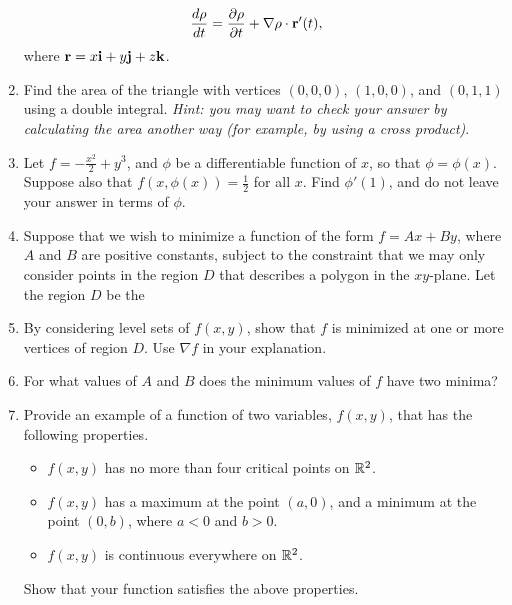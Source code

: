 \documentclass{article}
\begin{document}
\begin{enumerate}
\begin{align*}
  \frac{d\rho}{dt} &= \frac{\partial \rho}{\partial t} + \nabla \rho \cdot \mathbf{r}'(t),
\end{align*}
where $\mathbf{r} = x\mathbf{i}+y\mathbf{j}+z\mathbf{k}$.
\item %
Find the area of the triangle with vertices $(0,0,0)$, $(1,0,0)$, and $(0,1,1)$ using a double integral. \textit{Hint: you may want to check your answer by calculating the area another way (for example, by using a cross product)}.

\item %
Let $f=-\frac{x^2}{2}+y^3$, and $\phi$ be a differentiable function of $x$, so that $\phi = \phi(x)$. Suppose also that $f(x,\phi(x))=\frac{1}{2}$ for all $x$. Find $\phi'(1)$, and do not leave your answer in terms of $\phi$. 
\item %
Suppose that we wish to minimize a function of the form $f=Ax+By$, where $A$ and $B$ are positive constants, subject to the constraint that we may only consider points in the region $D$ that describes a polygon in the $xy$-plane. Let the region $D$ be the 
\BEN
\item By considering level sets of $f(x,y)$, show that $f$ is minimized at one or more vertices of region $D$. Use $\nabla f$ in your explanation. 
\item For what values of $A$ and $B$ does the minimum values of $f$ have two minima? 
\EEN
\item %
Provide an example of a function of two variables, $f(x,y)$, that has the following properties. 
\begin{itemize}
  \item $f(x,y)$ has no more than four critical points on $\mathbb{R}^2$.
  \item $f(x,y)$ has a maximum at the point $(a,0)$, and a minimum at the point $(0,b)$, where $a<0$ and $b>0$.
  \item $f(x,y)$ is continuous everywhere on $\mathbb{R}^2$.
\end{itemize}
Show that your function satisfies the above properties. 


\end{enumerate}
\end{document}
